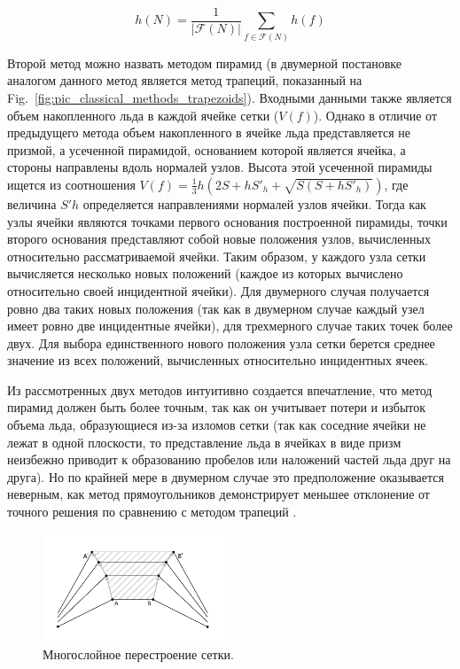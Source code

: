 \begin{equation}
h(N) = \frac{1}{|\mathscr{F}(N)|} \sum_{f \in \mathscr{F}(N)}{h(f)}
\end{equation}

Второй метод можно назвать методом пирамид (в двумерной постановке аналогом данного метод является метод трапеций, показанный на Fig.~\ref{fig:pic_classical_methods_trapezoids}).
Входными данными также является объем накопленного льда в каждой ячейке сетки ($V(f)$).
Однако в отличие от предыдущего метода объем накопленного в ячейке льда представляется не призмой, а усеченной пирамидой, основанием которой является ячейка, а стороны направлены вдоль нормалей узлов.
Высота этой усеченной пирамиды ищется из соотношения $V(f) = \frac{1}{3} h (2S + hS'_h + \sqrt{S(S + hS'_h)})$, где величина $S'h$ определяется направлениями нормалей узлов ячейки.
Тогда как узлы ячейки являются точками первого основания построенной пирамиды, точки второго основания представляют собой новые положения узлов, вычисленных относительно рассматриваемой ячейки.
Таким образом, у каждого узла сетки вычисляется несколько новых положений (каждое из которых вычислено относительно своей инцидентной ячейки).
Для двумерного случая получается ровно два таких новых положения (так как в двумерном случае каждый узел имеет ровно две инцидентные ячейки), для трехмерного случае таких точек более двух.
Для выбора единственного нового положения узла сетки берется среднее значение из всех положений, вычисленных относительно инцидентных ячеек.

Из рассмотренных двух методов интуитивно создается впечатление, что метод пирамид должен быть более точным, так как он учитывает потери и избыток объема льда, образующиеся из-за изломов сетки (так как соседние ячейки не лежат в одной плоскости, то представление льда в ячейках в виде призм неизбежно приводит к образованию пробелов или наложений частей льда друг на друга).
Но по крайней мере в двумерном случае это предположение оказывается неверным, как метод прямоугольников демонстрирует меньшее отклонение от точного решения по сравнению с методом трапеций \cite{Rybakov_2D}.

\begin{figure}
\includegraphics[width=0.48\textwidth]{pics/pic_classical_methods_multilayer_size.pdf}
\caption{Многослойное перестроение сетки.}\label{fig:pic_classical_methods_multilayer}
\end{figure}

